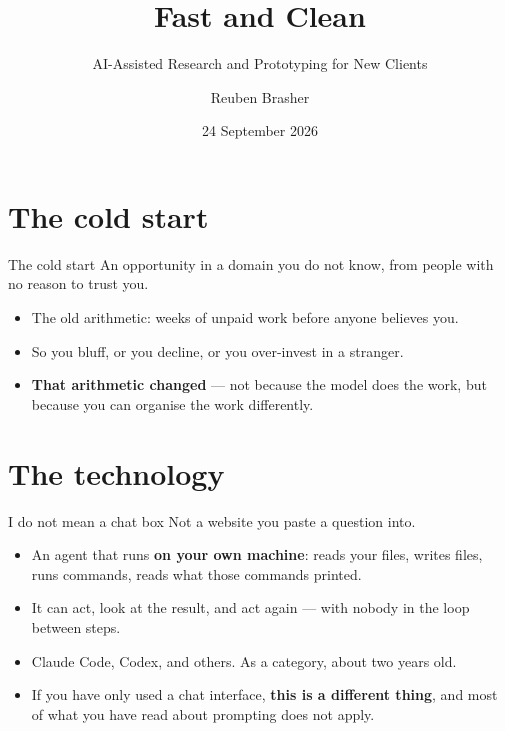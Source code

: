 \documentclass[aspectratio=169,t]{beamer}
\title{Fast and Clean}
\subtitle{AI-Assisted Research and Prototyping for New Clients}
\author{Reuben Brasher}
\institute{Head of Customer Delivery Engineering, Terra Quantum AG}
\date{24 September 2026}
\begin{document}
\frame{\titlepage}

\section{The cold start}

\begin{frame}{The cold start}
    An opportunity in a domain you do not know, from people with no reason to
    trust you.
    \begin{itemize}
        \item The old arithmetic: weeks of unpaid work before anyone believes you.
        \item So you bluff, or you decline, or you over-invest in a stranger.
        \item \textbf{That arithmetic changed} --- not because the model does the
              work, but because you can organise the work differently.
    \end{itemize}
\end{frame}

\section{The technology}

\begin{frame}{I do not mean a chat box}
    Not a website you paste a question into.
    \begin{itemize}
        \item An agent that runs \textbf{on your own machine}: reads your files,
              writes files, runs commands, reads what those commands printed.
        \item It can act, look at the result, and act again --- with nobody in
              the loop between steps.
        \item Claude Code, Codex, and others. As a category, about two years old.
        \item If you have only used a chat interface, \textbf{this is a different
              thing}, and most of what you have read about prompting does not apply.
    \end{itemize}
\end{frame}
\end{document}
